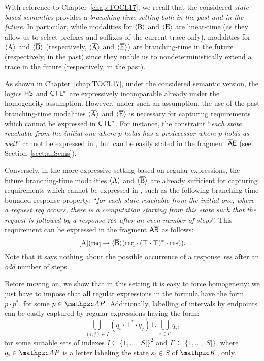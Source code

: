 With reference to Chapter~\ref{chap:TOCL17}, we recall that
the considered \emph{state-based semantics} provides a \emph{branching-time 
setting both in 
the past and in the future}. In particular, while modalities for $\operatorname{\langle B\rangle}$ and 
$\operatorname{\langle E\rangle}$ are linear-time (as they allow us to select prefixes and suffixes of the 
current trace only), modalities for $\operatorname{\langle A\rangle}$ and $\operatorname{\langle \overline{B}\rangle}$ (respectively, $\operatorname{\langle \overline{A}\rangle}$ 
and $\operatorname{\langle \overline{E}\rangle}$) are branching-time in the future (respectively, in the past) since 
they enable us to nondeterministically extend a trace in the future 
(respectively, in the past). 

As shown in Chapter~\ref{chap:TOCL17}, under the 
considered semantic version, the logics $\text{\sffamily HS}$ and $\text{\sffamily CTL$^{*}$}$ are expressively 
incomparable already under the homogeneity assumption. However, under such an 
assumption, the use of  the past branching-time modalities $\operatorname{\langle \overline{A}\rangle}$ and $\operatorname{\langle \overline{E}\rangle}$ 
is necessary for capturing requirements which cannot be expressed in 
$\text{\sffamily CTL$^{*}$}$. For instance, the constraint
``\emph{each state reachable from the initial one where $p$ holds has a 
predecessor where $p$ holds as well}'' cannot be expressed in \CTLStar, but can 
be easily stated in the fragment $\mathsf{\overline{A}E}$ (see Section~\ref{sect:allSems}). 

Conversely, in the more expressive  setting based on regular expressions, the future branching-time modalities $\operatorname{\langle A\rangle}$ and $\operatorname{\langle \overline{B}\rangle}$ are already sufficient for capturing requirements which cannot be expressed in \CTLStar, such as the following branching-time bounded response property: ``\emph{for each state reachable from the initial one, where a request  $\emph{req}$ occurs, there is a computation starting from this state such that the request is followed by a response $\emph{res}$ after an  \emph{even number} of steps}''. This requirement can be expressed in the  fragment $\mathsf{A\overline{B}}$ as follows: 
\[\operatorname{\mathopen[ A \mathclose]}(\text{req} \rightarrow \operatorname{\langle \overline{B}\rangle} (\text{req}\cdot (\top\cdot \top)^{*}\cdot \text{res})).\] 
Note that it says nothing about the possible occurrence of a response 
$\emph{res}$ after an \emph{odd} number of steps.

Before moving on, we show that
in this setting it is easy to force homogeneity: we just have to impose that 
all 
regular expressions in the formula have the form $p\cdot p^*$, for some 
$p\in\Prop$.
Additionally, labelling of 
intervals by endpoints can be easily captured by regular expressions having the form:
\[\bigcup_{(i,j)\in I} (q_i\cdot \top^*\cdot q_j)\cup\bigcup_{i\in I'} q_{i},\]
for some suitable sets of indexes $I\subseteq \{1,\ldots,|S|\}^2$ and 
$I'\subseteq \{1,\ldots,|S|\}$, where $q_i\in\Prop$ is a letter labeling the 
state $s_i\in S$ of $\Ku$, only.

